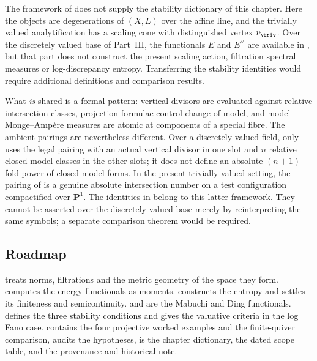 The framework of  does not supply the stability dictionary
of this chapter.  Here the objects are degenerations of $(X,L)$ over the
affine line, and the trivially valued analytification has a scaling cone
with distinguished vertex $v_{\triv}$.  Over the discretely valued base of
Part~III, the functionals $E$ and $E^\vee$ are available in
, but that part does
not construct the present scaling action, filtration spectral measures or
log-discrepancy entropy.  Transferring the stability identities would
require additional definitions and comparison results.

What \emph{is} shared is a formal pattern: vertical divisors are evaluated
against relative intersection classes, projection formulae control change
of model, and model Monge--Amp\`ere measures are atomic at components of a
special fibre.  The ambient pairings are nevertheless different.  Over a
discretely valued field,  only uses the legal pairing
with an actual vertical divisor in one slot and $n$ relative closed-model
classes in the other slots; it does not define an absolute
$(n+1)$-fold power of closed model forms.  In the present trivially
valued setting, the pairing of  is a genuine
absolute intersection number on a test configuration compactified over
$\mathbf P^1$.  The identities in  belong to this
latter framework.  They cannot be asserted over the discretely valued
base merely by reinterpreting the same symbols; a separate comparison
theorem would be required.

\subsection{Roadmap}
\label{sec:ch50-roadmap}

 treats norms, filtrations and the metric geometry of
the space they form.   computes the energy functionals as
moments.   constructs the entropy and settles its
finiteness and semicontinuity.   and
 are the Mabuchi and Ding functionals.
 defines the three stability conditions and
 gives the valuative criteria in the log Fano
case.   contains the four projective worked examples and
the finite-quiver comparison,
 audits the hypotheses,
 is the chapter dictionary,
 the dated scope table, and
 the provenance and historical note.

